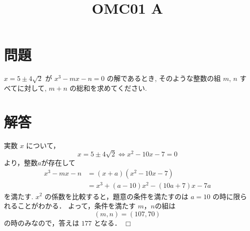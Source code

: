 \documentclass[uplatex,dvipdfmx,a4paper]{jsarticle}
\title{OMC01 A}
\date{}
\author{}
\def\qed{\hfill $\Box$}
\newenvironment{problem}{\section*{問題}}{}
\newenvironment{solution}{\section*{解答}}{\qed}
\begin{document}
\maketitle
\begin{problem}
    $x=5 \pm 4\sqrt{2}$ が $x^3-mx-n=0$  の解であるとき, そのような整数の組 $m$, $n$ すべてに対して, $m+n$ の総和を求めてください.
\end{problem}

\begin{solution}
    実数 $x$ について，
    \[
        x = 5 \pm 4 \sqrt{2} \Leftrightarrow x^2-10x-7=0 
    \]
    より，整数$a$が存在して
    \begin{align*}
        x^3-mx-n &= (x+a)(x^2-10x-7) \\
        &= x^3+(a-10)x^2-(10a+7)x-7a       
    \end{align*}
    を満たす.
    $x^2$ の係数を比較すると，題意の条件を満たすのは $a=10$ の時に限られることがわかる．
    よって，条件を満たす $m$，$n$の組は
    \[
        (m, n) = (107, 70)
    \]
    の時のみなので，答えは $177$ となる．
\end{solution}
\end{document}
